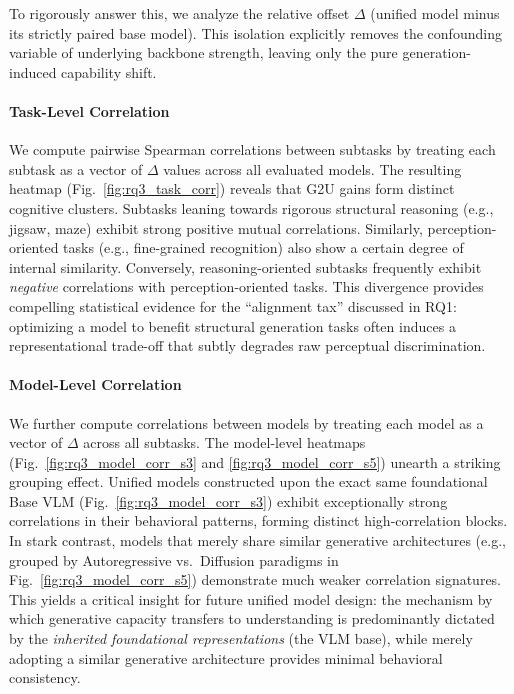 \documentclass{article}
\theoremstyle{plain}
\theoremstyle{definition}
\theoremstyle{remark}
\begin{document}
To rigorously answer this, we analyze the relative offset $\Delta$ (unified model minus its strictly paired base model). This isolation explicitly removes the confounding variable of underlying backbone strength, leaving only the pure generation-induced capability shift.

\paragraph{Task-Level Correlation}
We compute pairwise Spearman correlations between subtasks by treating each subtask as a vector of $\Delta$ values across all evaluated models. The resulting heatmap (Fig.~\ref{fig:rq3_task_corr}) reveals that G2U gains form distinct cognitive clusters. Subtasks leaning towards rigorous structural reasoning (e.g., jigsaw, maze) exhibit strong positive mutual correlations. Similarly, perception-oriented tasks (e.g., fine-grained recognition) also show a certain degree of internal similarity. Conversely, reasoning-oriented subtasks frequently exhibit \emph{negative} correlations with perception-oriented tasks. This divergence provides compelling statistical evidence for the ``alignment tax'' discussed in RQ1: optimizing a model to benefit structural generation tasks often induces a representational trade-off that subtly degrades raw perceptual discrimination.

\paragraph{Model-Level Correlation}
We further compute correlations between models by treating each model as a vector of $\Delta$ across all subtasks. The model-level heatmaps (Fig.~\ref{fig:rq3_model_corr_s3} and \ref{fig:rq3_model_corr_s5}) unearth a striking grouping effect. Unified models constructed upon the exact same foundational Base VLM (Fig.~\ref{fig:rq3_model_corr_s3}) exhibit exceptionally strong correlations in their behavioral patterns, forming distinct high-correlation blocks. In stark contrast, models that merely share similar generative architectures (e.g., grouped by Autoregressive vs.\ Diffusion paradigms in Fig.~\ref{fig:rq3_model_corr_s5}) demonstrate much weaker correlation signatures. This yields a critical insight for future unified model design: the mechanism by which generative capacity transfers to understanding is predominantly dictated by the \emph{inherited foundational representations} (the VLM base), while merely adopting a similar generative architecture provides minimal behavioral consistency.
\end{document}
